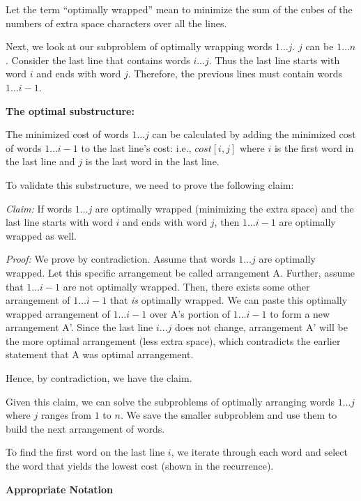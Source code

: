 \documentclass[a4paper]{report}
\begin{document}
\begin{enumerate}
      Let the term ``optimally wrapped'' mean to minimize the sum of the cubes of the numbers of extra space characters
      over all the lines. 

      Next, we look at our subproblem of optimally wrapping words $1 \dots j$. 
      $j$ can be $1 \dots n$. Consider the last line that contains words
      $i \dots j$. Thus the last line starts with word $i$ and ends with word $j$. Therefore, the previous lines must contain
      words $1 \dots i-1$.

      {\bf The optimal substructure:}
      
      The minimized cost of words $1\dots j$ can be calculated by adding the minimized cost of words $1\dots i-1$ 
      to the last line's
      cost: i.e., $cost[i,j]$ where $i$ is the first word in the last line and $j$ is the last word in the last line. 

      To validate this substructure, we need to prove the following claim:

      {\it Claim: }  If words $1 \dots j$ are optimally wrapped (minimizing the extra space) and the last line
      starts with word $i$ and ends with word $j$, then $1 \dots i-1$ are optimally wrapped as well. 

      {\it Proof: } We prove by contradiction. Assume that words $1 \dots j$ are optimally wrapped. Let this specific arrangement be
      called arrangement A. Further,
      assume that $1 \dots i-1$ are not optimally wrapped. Then, there exists some other arrangement of $1 \dots i-1$ that
      {\it is} optimally wrapped. We can paste this optimally wrapped arrangement of $1 \dots i-1$ over A's portion of
      $1 \dots i-1$ to form a new arrangement A'. Since
      the last line $i \dots j$ does not change, arrangement A' will be the more optimal arrangement (less extra space), 
      which contradicts the earlier statement that A was optimal arrangement. 

      Hence, by contradiction, we have the claim.

      Given this claim, we can solve the subproblems of optimally arranging words $1 \dots j$ where $j$ ranges from $1$ to $n$.
      We save the smaller subproblem and use them to build the next arrangement of words.

      To find the first word on the last line $i$, we iterate through each word and select the word that yields
      the lowest cost (shown in the recurrence). 

      {\bf Appropriate Notation}


\end{enumerate}
\end{document}
